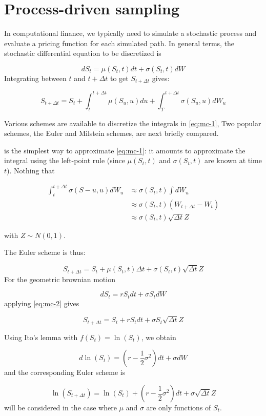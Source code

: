 \documentclass[12pt,]{tufte-book}
\begin{document}
\hypertarget{process-driven-sampling}{%
\section{Process-driven sampling}\label{process-driven-sampling}}

In computational finance, we typically need to simulate a stochastic process and evaluate a pricing function for each simulated path. In general terms, the stochastic differential equation to be discretized is

\[
dS_t = \mu(S_t, t)dt + \sigma(S_t, t)dW
\]
Integrating between \(t\) and \(t+\Delta t\) to get \(S_{t+\Delta t}\) gives:

\[
S_{t+\Delta t} = S_t + \int_t^{t+\Delta t} \mu(S_u, u) du + \int_T^{t+\Delta t} \sigma(S_u, u) dW_u
\label{eq:mc-1}
\]

Various schemes are available to discretize the integrals in \eqref{eq:mc-1}, Two popular schemes, the Euler and Milstein schemes, are next briefly compared.

 is the simplest way to approximate \eqref{eq:mc-1}: it amounts to approximate the integral using the left-point rule (since \(\mu(S_t, t)\) and \(\sigma(S_t, t)\) are known at time \(t\)). Nothing that

\begin{align}
\int_t^{t+\Delta t} \sigma(S-u, u) dW_u &\approx \sigma(S_t, t) \int dW_u \\
&\approx \sigma(S_t, t) \left(W_{t+\Delta t} - W_t \right) \\
&\approx \sigma(S_t, t) \sqrt{\Delta t} Z
\end{align}

with \(Z \sim N(0, 1)\).

The Euler scheme is thus:

\[
S_{t+\Delta t} = S_t + \mu(S_t, t) \Delta t + \sigma(S_t, t) \sqrt{\Delta t} Z
\label{eq:mc-2}
\]
For the geometric brownian motion

\[
dS_t = r S_t dt + \sigma S_t dW
\label{eq:mc-gbm}
\]
applying \eqref{eq:mc-2} gives

\[
S_{t+\Delta t} = S_t + rS_t dt + \sigma S_t \sqrt{\Delta t} Z
\]

Using Ito's lemma with \(f(S_t) = \ln(S_t)\), we obtain

\[
d \ln(S_t) = (r-\frac{1}{2} \sigma^2) dt + \sigma dW
\label{eq:mc-3}
\]
and the corresponding Euler scheme is

\[
\ln(S_{t+\Delta t}) = \ln(S_t) + (r - \frac{1}{2} \sigma^2) dt + \sigma \sqrt{\Delta t} Z
\]
 will be considered in the case where \(\mu\) and \(\sigma\) are only functions of \(S_t\).
\end{document}
